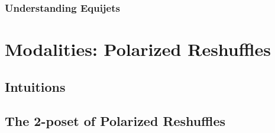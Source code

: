 \documentclass[a4paper]{memoir}
\begin{document}
\subsection{Understanding Equijets}

\chapter{Modalities: Polarized Reshuffles} \label{ch:modalities}

\section{Intuitions}

\section{The 2-poset of Polarized Reshuffles} \label{sec:poreshcat}
\end{document}
